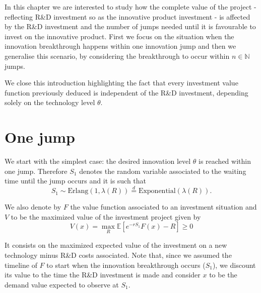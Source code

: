 


In this chapter we are interested to study how the complete value of the project - reflecting R\&D investment so as the innovative product investment - is affected by the R\&D investment and the number of jumps needed until it is favourable to invest on the innovative product. First we focus on the situation when the innovation breakthrough happens within one innovation jump and then we generalise this scenario, by considering the breakthrough to occur within $n\in\mathds{N}$ jumps.


We close this introduction highlighting the fact that every investment value function previously deduced is independent of the R\&D investment, depending solely on the technology level $\theta$.

\section{One jump}
\label{section:max_1jump}

We start with the simplest case: the desired innovation level $\theta$ is reached within one jump.
Therefore $S_1$ denotes the random variable associated to the waiting time until the jump occurs and it is such that
$$S_1 \sim \text{Erlang}(1,\lambda(R)) \overset{d}{=} \text{Exponential}(\lambda(R)).$$

We also denote by $F$ the value function associated to an investment situation and $V$ to be the maximized value of the investment project given by
\begin{equation}
	V(x)=\max_R \mathds{E} [ e^{-rS_1}F(x)-R]\geq 0
	\label{max_V}
\end{equation}

It consists on the maximized expected value of the investment on a new technology minus R\&D costs associated. Note that, since we assumed the timeline of $F$ to start when the innovation breakthrough occurs ($S_1$), we discount its value to the time the R\&D investment is made and consider $x$ to be the demand value expected to observe at $S_1$.


